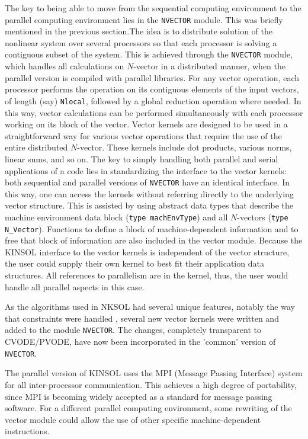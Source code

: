 The key to being able to move from the sequential computing
environment to the parallel computing environment lies in the {\tt NVECTOR}
module. This was briefly mentioned in the previous section.The idea is to 
distribute solution of the nonlinear system over several processors so that 
each processor is solving a contiguous subset of the system. This is achieved 
through the {\tt NVECTOR} module, which handles all calculations on $N$-vector
in a distributed manner, when the parallel version is compiled with parallel 
libraries. For any vector operation, each processor performs the operation on 
its contiguous 
elements of the input vectors, of length (say) {\tt Nlocal}, followed 
by a global reduction operation where needed.  In this way, vector 
calculations can be performed simultaneously with each processor 
working on its block of the vector. Vector kernels are designed to be 
used in a straightforward way for various vector operations that 
require the use of the entire distributed $N$-vector.  These kernels 
include dot products, various norms, linear sums, and so on. The key 
to simply handling both parallel and serial applications of a code 
lies in standardizing the interface to the vector kernels: both sequential and
parallel versions of {\tt NVECTOR} have an identical interface. In this way, 
one can access the kernels without referring directly to the underlying 
vector structure. This is assisted by using abstract data types that 
describe the machine environment data block ({\tt type machEnvType}) 
and all $N$-vectors ({\tt type N\_Vector}). Functions
to define a block of machine-dependent information and to free that block of 
information are also included in the vector module. Because the KINSOL
interface to the vector kernels is independent of the vector structure, the
user could supply their own kernel to best fit their application data 
structures. All references to parallelism are in the kernel, thus, the user
would handle all parallel aspects in this case.

As the algorithms used in NKSOL had several unique features, notably the way 
that constraints were handled \cite{BrSa90}, several new vector 
kernels were written and added to the module {\tt NVECTOR}. The changes, 
completely transparent to CVODE/PVODE, have now been incorporated in the
'common' version of {\tt NVECTOR}.

The parallel version of KINSOL uses the MPI (Message Passing
Interface) system \cite{MPI} for all inter-processor
communication. This achieves a high degree of portability, since MPI
is becoming widely accepted as a standard for message passing
software. For a different parallel computing environment, some rewriting of the
vector module could allow the use of other specific machine-dependent
instructions.

